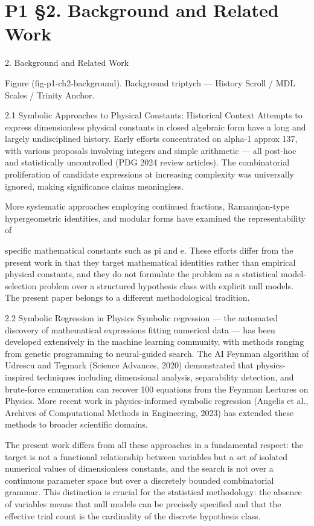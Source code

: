 
\section{P1 §2. Background and Related Work}

2. Background and Related Work

       Figure (fig-p1-ch2-background). Background triptych --- History Scroll / MDL Scales / Trinity
                                               Anchor.

  2.1 Symbolic Approaches to Physical Constants: Historical Context
  Attempts to express dimensionless physical constants in closed algebraic form have a
  long and largely undisciplined history. Early efforts concentrated on alpha-1 approx
  137, with various proposals involving integers and simple arithmetic --- all post-hoc and
  statistically uncontrolled (PDG 2024 review articles). The combinatorial proliferation of
  candidate expressions at increasing complexity was universally ignored, making
  significance claims meaningless.

  More systematic approaches employing continued fractions, Ramanujan-type
  hypergeometric identities, and modular forms have examined the representability of

  specific mathematical constants such as pi and e. These efforts differ from the present
  work in that they target mathematical identities rather than empirical physical
  constants, and they do not formulate the problem as a statistical model-selection
  problem over a structured hypothesis class with explicit null models. The present paper
  belongs to a different methodological tradition.

  2.2 Symbolic Regression in Physics
  Symbolic regression --- the automated discovery of mathematical expressions fitting
  numerical data --- has been developed extensively in the machine learning community,
  with methods ranging from genetic programming to neural-guided search. The AI
  Feynman algorithm of Udrescu and Tegmark (Science Advances, 2020) demonstrated
  that physics-inspired techniques including dimensional analysis, separability detection,
  and brute-force enumeration can recover 100 equations from the Feynman Lectures on
  Physics. More recent work in physics-informed symbolic regression (Angelis et al.,
  Archives of Computational Methods in Engineering, 2023) has extended these methods
  to broader scientific domains.

  The present work differs from all these approaches in a fundamental respect: the target
  is not a functional relationship between variables but a set of isolated numerical values
  of dimensionless constants, and the search is not over a continuous parameter space
  but over a discretely bounded combinatorial grammar. This distinction is crucial for the
  statistical methodology: the absence of variables means that null models can be
  precisely specified and that the effective trial count is the cardinality of the discrete
  hypothesis class.

